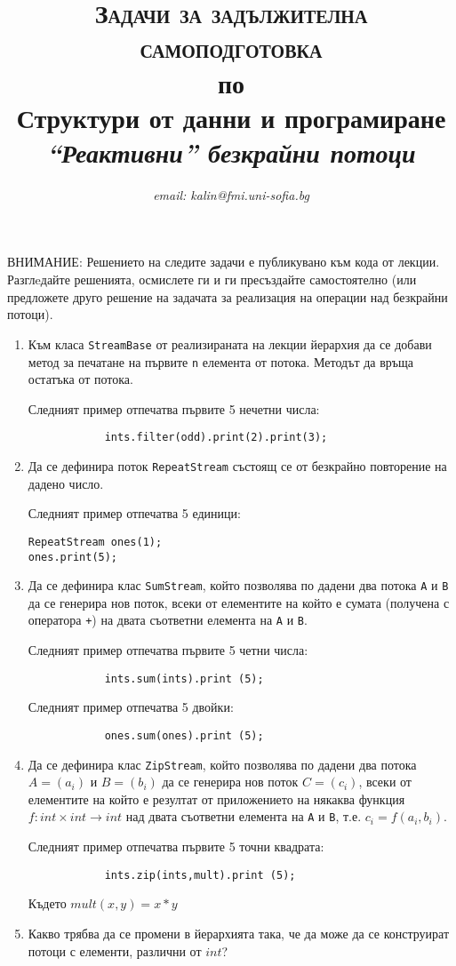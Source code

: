 \documentclass[12pt,a4paper]{article}
\author{\textit{email: kalin@fmi.uni-sofia.bg}}
\title{\textsc{Задачи за задължителна самоподготовка} \\
по \\
Структури от данни и програмиране\\
\textit{``Реактивни'' безкрайни потоци}}
\begin{document}
\maketitle


ВНИМАНИЕ: Решението на следите задачи е публикувано към кода от лекции. Разглeдайте решенията, осмислете ги и ги пресъздайте самостоятелно (или предложете друго решение на задачата за реализация на операции над безкрайни потоци).

\begin{enumerate}

	\item  Към класа \texttt{StreamBase} от реализираната на лекции йерархия да се добави метод за печатане на първите \texttt{n} елемента от потока. Методът да връща остатъка от потока.


	Следният пример отпечатва първите 5 нечетни числа:
	\begin{verbatim}
			ints.filter(odd).print(2).print(3);
	\end{verbatim}

	\item Да се дефинира поток \texttt{RepeatStream} състоящ се от безкрайно повторение на дадено число.

	Следният пример отпечатва 5 единици:
	\begin{verbatim}
RepeatStream ones(1);
ones.print(5);
	\end{verbatim}


	\item Да се дефинира клас \texttt{SumStream}, който позволява по дадени два потока \texttt{A} и \texttt{B} да се генерира нов поток, всеки от елементите на който е сумата (получена с оператора \texttt{+}) на двата съответни елемента на \texttt{A} и \texttt{B}.

	Следният пример отпечатва първите 5 четни числа:
	\begin{verbatim}
			ints.sum(ints).print (5);
	\end{verbatim}

	Следният пример отпечатва 5 двойки:
	\begin{verbatim}
			ones.sum(ones).print (5);
	\end{verbatim}


	\item Да се дефинира клас \texttt{ZipStream}, който позволява по дадени два потока $A=(a_i)$ и $B=(b_i)$ да се генерира нов поток $C=(c_i)$, всеки от елементите на който е резултат от приложението на някаква функция $f:int \times int \rightarrow int$ над двата съответни елемента на \texttt{A} и \texttt{B}, т.е. $c_i=f(a_i,b_i)$.

	Следният пример отпечатва първите 5 точни квадрата:
	\begin{verbatim}
			ints.zip(ints,mult).print (5);
	\end{verbatim}
	 Където $mult(x,y)=x*y$

	 \item Какво трябва да се промени в йерархията така, че да може да се конструират потоци с елементи, различни от $int$?

\end{enumerate}


	\vspace{20px}
\end{document}
